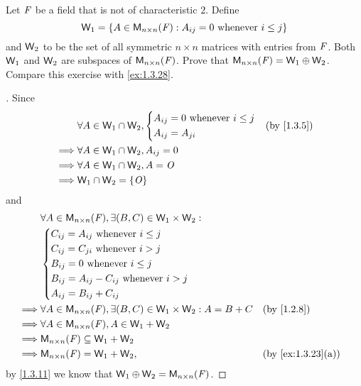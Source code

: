 \begin{ex}\label{ex:1.3.29}
	Let \(\mathit{F}\) be a field that is not of characteristic \(2\).
	Define
	\[
		\mathsf{W}_1 = \left\lbrace A \in \mathsf{M}_{{n} \times n}({\mathit{F}}) : A_{i j} = 0 \text{ whenever } i \leq j\right\rbrace
	\]
	and \(\mathsf{W}_2\) to be the set of all symmetric \(n \times n\) matrices with entries from \(\mathit{F}\).
	Both \(\mathsf{W}_1\) and \(\mathsf{W}_2\) are subspaces of \(\mathsf{M}_{{n} \times n}({\mathit{F}})\).
	Prove that \(\mathsf{M}_{{n} \times n}({\mathit{F}}) = \mathsf{W}_1 \oplus \mathsf{W}_2\).
	Compare this exercise with \cref{ex:1.3.28}.
\end{ex}

\begin{proof}[]
	Since
	\begin{align*}
		         & \forall A \in \W_1 \cap \W_2, \begin{dcases}
			                                         A_{i j} = 0 \text{ whenever } i \leq j \\
			                                         A_{i j} = A_{j i}
		                                         \end{dcases} &  & \by{1.3.5} \\
		\implies & \forall A \in \W_1 \cap \W_2, A_{i j} = 0                            \\
		\implies & \forall A \in \W_1 \cap \W_2, A = \zm                                \\
		\implies & \W_1 \cap \W_2 = \set{\zm}
	\end{align*}
	and
	\begin{align*}
		         & \forall A \in \ms{n}{n}{\F}, \exists (B, C) \in \W_1 \times \W_2 :                                  \\
		         & \begin{dcases}
			           C_{i j} = A_{i j} \text{ whenever } i \leq j        \\
			           C_{i j} = C_{j i} \text{ whenever } i > j           \\
			           B_{i j} = 0 \text{ whenever } i \leq j              \\
			           B_{i j} = A_{i j} - C_{i j} \text{ whenever } i > j \\
			           A_{i j} = B_{i j} + C_{i j}
		           \end{dcases}                                                 \\
		\implies & \forall A \in \ms{n}{n}{\F}, \exists (B, C) \in \W_1 \times \W_2 : A = B + C &  & \by{1.2.8}        \\
		\implies & \forall A \in \ms{n}{n}{\F}, A \in \W_1 + \W_2                                                      \\
		\implies & \ms{n}{n}{\F} \subseteq \W_1 + \W_2                                                                 \\
		\implies & \ms{n}{n}{\F} = \W_1 + \W_2,                                                 &  & \by{ex:1.3.23}[a]
	\end{align*}
	by \cref{1.3.11} we know that \(\mathsf{W}_1 \oplus \mathsf{W}_2 = \mathsf{M}_{{n} \times n}({\mathit{F}})\).
\end{proof}

